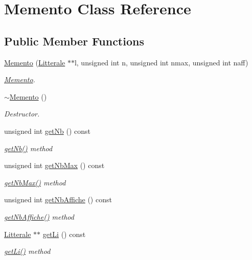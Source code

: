 \hypertarget{class_memento}{}\section{Memento Class Reference}
\label{class_memento}
\subsection*{Public Member Functions}
\begin{DoxyCompactItemize}
\item 
\hyperlink{class_memento_a7d4237ea6a8300c6018e2a44090f333d}{Memento} (\hyperlink{class_litterale}{Litterale} $\ast$$\ast$l, unsigned int n, unsigned int nmax, unsigned int naff)
\begin{DoxyCompactList}\small\item\em \hyperlink{class_memento}{Memento}. \end{DoxyCompactList}\item 
\hyperlink{class_memento_af680b5488989567d0f03d655c4232924}{$\sim$\+Memento} ()
\begin{DoxyCompactList}\small\item\em Destructor. \end{DoxyCompactList}\item 
unsigned int \hyperlink{class_memento_a773dd66df5272e0d78b849b3a0d1678f}{get\+Nb} () const 
\begin{DoxyCompactList}\small\item\em \hyperlink{class_memento_a773dd66df5272e0d78b849b3a0d1678f}{get\+Nb()} method \end{DoxyCompactList}\item 
unsigned int \hyperlink{class_memento_a65ff8c9c8c968294a6fc4efb56a84b72}{get\+Nb\+Max} () const 
\begin{DoxyCompactList}\small\item\em \hyperlink{class_memento_a65ff8c9c8c968294a6fc4efb56a84b72}{get\+Nb\+Max()} method \end{DoxyCompactList}\item 
unsigned int \hyperlink{class_memento_a7cee4f9bdb0a66cfe246104804f7495f}{get\+Nb\+Affiche} () const 
\begin{DoxyCompactList}\small\item\em \hyperlink{class_memento_a7cee4f9bdb0a66cfe246104804f7495f}{get\+Nb\+Affiche()} method \end{DoxyCompactList}\item 
\hyperlink{class_litterale}{Litterale} $\ast$$\ast$ \hyperlink{class_memento_a81b870066375204cbf460038d30f1e37}{get\+Li} () const 
\begin{DoxyCompactList}\small\item\em \hyperlink{class_memento_a81b870066375204cbf460038d30f1e37}{get\+Li()} method \end{DoxyCompactList}\end{DoxyCompactItemize}


